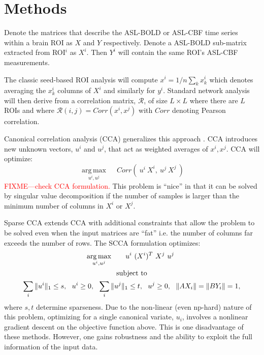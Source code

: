 \documentclass{llncs}
\begin{document}
\section*{Methods}
Denote the matrices that describe the ASL-BOLD or ASL-CBF time series within a brain ROI as $X$ and $Y$ respectively.  Denote a ASL-BOLD sub-matrix extracted from ROI$^i$ as $X^i$.  Then $Y^i$ will contain the same ROI's ASL-CBF measurements.

The classic seed-based ROI analysis will compute $x^i = 1/n \sum_k x^i_k$ which denotes averaging the $x^i_k$ columns of $X^i$ and similarly for $y^i$.  Standard network analysis will then derive from a correlation matrix, $\mathcal{R}$, of size $L \times L$ where there are $L$ ROIs and where $\mathcal{R}(i,j)=Corr(x^i,x^j)$ with $Corr$ denoting Pearson correlation. 

Canonical correlation analysis (CCA) generalizes this approach \cite{Hotelling}.  CCA introduces new unknown vectors, $u^i$ and $u^j$, that act as weighted averages of $x^i, x^j$.  CCA will optimize:
\begin{equation}
\underset{u^i,u^j}{\operatorname{arg\,max}} \quad~ Corr(~u^i~X^i,~u^j~X^j~) 
\end{equation}
\textcolor{red}{FIXME---check CCA formulation.}
This problem is ``nice'' in that it can be solved by singular value decomposition if the number of samples is larger than the minimum number of columns in $X^i$ or $X^j$.

Sparse CCA extends CCA with additional constraints that allow the problem to be solved even when the input matrices are ``fat'' i.e. the number of columns far exceeds the number of rows.  The SCCA formulation optimizes: 
\begin{gather*}
\underset{u^i,u^j}{\operatorname{arg\,max}} \quad~ ~~u^i~(X^i)^T ~X^j~u^j~\\ \notag \text{subject to} \\ \notag
\sum_i \|u^i\|_1 \leq s, ~~ u^i \ge 0,~~ \sum_i \|u^j\|_1 \leq t, ~~ u^j \ge 0 , ~~\| A X_i \| = \| B Y_i \| = 1,
\end{gather*}
where $s, t$ determine sparseness.  Due to the non-linear (even np-hard) nature of this problem, optimizing for a single canonical variate, $u_i$, involves a nonlinear gradient descent on the objective function above.  This is one disadvantage of these methods.  However, one gains robustness and the ability to exploit the full information of the input data.  
\end{document}

